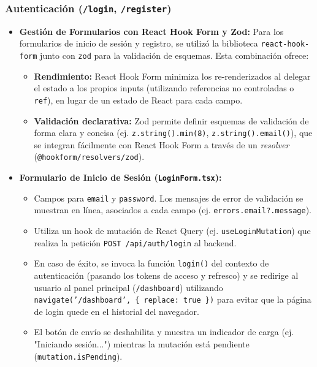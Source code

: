 \subsubsection{Autenticación (\texttt{/login}, \texttt{/register})}
\label{sssec:desarrollo_auth_pages}

\begin{itemize}[leftmargin=*]
  \item \textbf{Gestión de Formularios con React Hook Form y Zod:} Para los formularios de inicio de sesión y registro, se utilizó la biblioteca \texttt{react-hook-form} junto con \texttt{zod} para la validación de esquemas. Esta combinación ofrece:
        \begin{itemize}
            \item \textbf{Rendimiento:} React Hook Form minimiza los re-renderizados al delegar el estado a los propios inputs (utilizando referencias no controladas o \texttt{ref}), en lugar de un estado de React para cada campo.
            \item \textbf{Validación declarativa:} Zod permite definir esquemas de validación de forma clara y concisa (ej. \texttt{z.string().min(8)}, \texttt{z.string().email()}), que se integran fácilmente con React Hook Form a través de un \emph{resolver} (\texttt{@hookform/resolvers/zod}).
        \end{itemize}

  \item \textbf{Formulario de Inicio de Sesión (\texttt{LoginForm.tsx}):}
        \begin{itemize}
          \item Campos para \texttt{email} y \texttt{password}. Los mensajes de error de validación se muestran en línea, asociados a cada campo (ej. \texttt{errors.email?.message}).
          \item Utiliza un hook de mutación de React Query (ej. \texttt{useLoginMutation}) que realiza la petición \texttt{POST /api/auth/login} al backend.
          \item En caso de éxito, se invoca la función \texttt{login()} del contexto de autenticación (pasando los tokens de acceso y refresco) y se redirige al usuario al panel principal (\texttt{/dashboard}) utilizando \texttt{navigate('/dashboard', \{ replace: true \})} para evitar que la página de login quede en el historial del navegador.
          \item El botón de envío se deshabilita y muestra un indicador de carga (ej. "Iniciando sesión...") mientras la mutación está pendiente \\ (\texttt{mutation.isPending}).
        \end{itemize}


\end{itemize}
